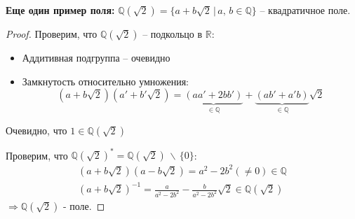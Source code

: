 \textbf{Еще один пример поля:} $\mathbb{Q}(\sqrt{2}) = \{ a + b\sqrt{2} \, | \, a, \, b \in \mathbb{Q} \} $ -- квадратичное поле.
\begin{proof} \quad
  
    Проверим, что $\mathbb{Q}(\sqrt{2})$ -- подкольцо в $\mathbb{R}$:
    \begin{itemize}
        \item Аддитивная подгруппа -- очевидно 
        \item Замкнутость относительно умножения:
        \[ (a + b\sqrt{2})(a' + b'\sqrt{2}) = \underbrace{(aa' + 2bb')}_{\in \mathbb{Q}} + \underbrace{(ab' + a'b)}_{\in \mathbb{Q}}\sqrt{2} \] 
    \end{itemize}
    Очевидно, что $1 \in \mathbb{Q}(\sqrt{2})$
  
    Проверим, что $\mathbb{Q}(\sqrt{2})^* = \mathbb{Q}(\sqrt{2}) \, \backslash \, \{ 0 \}$:
    \begin{gather*}
        (a + b\sqrt{2})(a - b\sqrt{2}) = a^2 - 2b^2 (\neq 0)\in \mathbb{Q} \\
        (a + b\sqrt{2})^{-1} = \frac{a}{a^2 - 2b^2} - \frac{b}{a^2 - 2b^2}\sqrt{2} \in \mathbb{Q}(\sqrt{2})
    \end{gather*}
    $\Rightarrow \mathbb{Q}(\sqrt{2})$ - поле.
\end{proof}